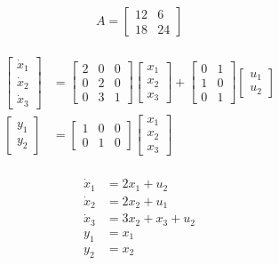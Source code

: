 
\begin{equation}\label{key}
A=\left [\begin{array}{cc}
 12 & 6\\
 18 & 24
\end{array}\right  ]
\end{equation}
\newline~\newline
\begin{align}\label{key}
\left [\begin{array}{c}
\dot{x}_1\\
\dot{x}_2\\
\dot{x}_3
\end{array}\right  ]&=\left [\begin{array}{ccc}
2 & 0 & 0\\
0 & 2 & 0\\
0 & 3 & 1
\end{array}\right  ]\left [\begin{array}{c}
x_1\\
x_2\\
x_3
\end{array}\right  ]+\left [\begin{array}{cc}
0 & 1\\
1 & 0\\
0 & 1
\end{array}\right  ]\left [\begin{array}{c}
 u_1\\
 u_2
\end{array}\right  ]\\
\left [\begin{array}{c}
y_1\\
y_2
\end{array}\right  ]&=\left [\begin{array}{ccc}
1 & 0 & 0\\
0 & 1 & 0
\end{array}\right  ]\left [\begin{array}{c}
x_1\\
x_2\\
x_3
\end{array}\right  ]
\end{align}
\newline~\newline
\begin{align}\label{key}
\dot{x}_1&=2x_1+u_2\\
\dot{x}_2&=2x_2+u_1\\
\dot{x}_3&=3x_2+x_3+u_2\\
y_1&=x_1\\
y_2&=x_2
\end{align}

